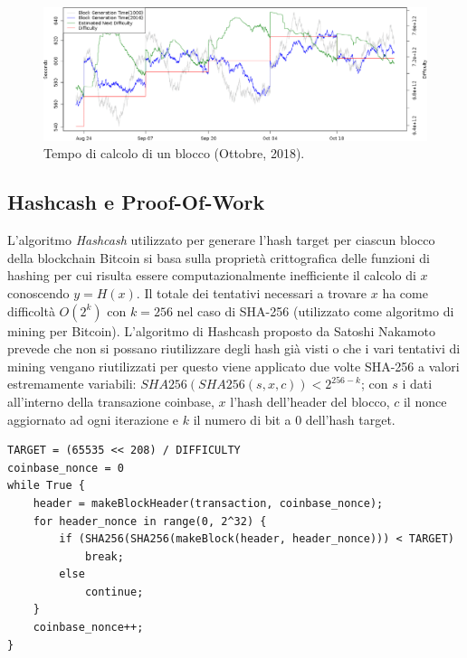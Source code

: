 \begin{enumerate}[1.]
\begin{figure}
    \centering
    \includegraphics[width=\textwidth]{images/diffvsblock.png}
    \caption{Tempo di calcolo di un blocco (Ottobre, 2018).}
\end{figure}

\subsection{Hashcash e Proof-Of-Work}
L'algoritmo \textit{Hashcash} utilizzato per generare l'hash target per ciascun blocco della blockchain Bitcoin si basa sulla proprietà crittografica delle funzioni di hashing per cui risulta essere computazionalmente inefficiente il calcolo di $x$ conoscendo $y=H(x)$. Il totale dei tentativi necessari a trovare $x$ ha come difficoltà $O(2^k)$ con $k=256$ nel caso di SHA-256 (utilizzato come algoritmo di mining per Bitcoin).\newline
L'algoritmo di Hashcash proposto da Satoshi Nakamoto prevede che non si possano riutilizzare degli hash già visti o che i vari tentativi di mining vengano riutilizzati per questo viene applicato due volte SHA-256 a valori estremamente variabili: $SHA256(SHA256(s,x,c))<2^{256-k}$; con $s$ i dati all'interno della transazione coinbase, $x$ l'hash dell'header del blocco, $c$ il nonce aggiornato ad ogni iterazione e $k$ il numero di bit a $0$ dell'hash target.
\begin{lstlisting}[caption=Pseudocodice dell'algoritmo di mining per Hashcash]
TARGET = (65535 << 208) / DIFFICULTY
coinbase_nonce = 0
while True {
    header = makeBlockHeader(transaction, coinbase_nonce);
    for header_nonce in range(0, 2^32) {
        if (SHA256(SHA256(makeBlock(header, header_nonce))) < TARGET)
            break;
        else
            continue;
    }
    coinbase_nonce++;
}
\end{lstlisting}

\end{enumerate}
